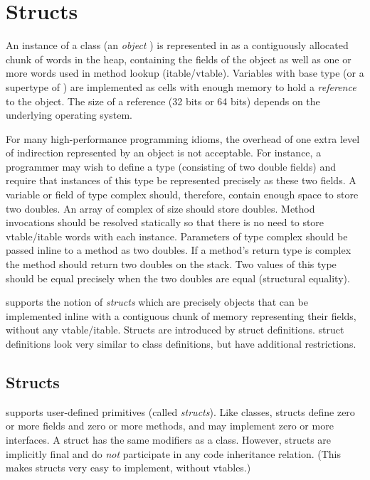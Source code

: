 \section{Structs}
\label{XtenStructs}
\label{StructClasses}
\label{Structs}

An instance of a class  (an \emph{object} ) is represented in \Xten{} as
a contiguously allocated chunk of words in the heap, containing the
fields of the object as well as one or more words used in method
lookup (itable/vtable). Variables with base type  (or a supertype of
) are implemented as cells with enough memory to hold a
\emph{reference} to the object. The size of a reference (32 bits or 64
bits) depends on the underlying operating system.


For many high-performance programming idioms, the overhead of one
extra level of indirection represented by an object is not
acceptable. For instance, a programmer may wish to define a type
 (consisting of two double fields) and require that instances
of this type be represented precisely as these two fields. A variable
or field of type complex should, therefore, contain enough space to
store two doubles. An array of complex of size  should store 
doubles. Method invocations should be resolved statically so that
there is no need to store vtable/itable words with each
instance. Parameters of type complex should be passed inline to a
method as two doubles. If a method's return type is complex the method
should return two doubles on the stack. Two values of this type should
be equal precisely when the two doubles are equal (structural
equality).


\Xten{} supports the notion of \emph{structs} which are precisely
objects that can be implemented inline with a contiguous chunk of
memory representing their fields, without any vtable/itable. Structs
are introduced by struct definitions. struct definitions look very
similar to class definitions, but have additional restrictions.

\subsection{Structs}
 \Xten{} supports user-defined primitives (called
 \emph{structs}). Like classes, structs define zero or more fields and
 zero or more methods, and may implement zero or more interfaces. A
 struct has the same modifiers as a class. However, structs are
 implicitly final and do \emph{not} participate in any code
 inheritance relation. (This makes structs very easy to implement,
 without vtables.)

